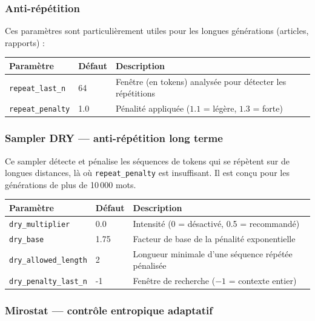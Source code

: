 \documentclass[12pt, a4paper, twoside]{article}
\begin{document}
\subsubsection{Anti-répétition}

Ces paramètres sont particulièrement utiles pour les longues générations (articles, rapports) :

\begin{center}
\begin{tabular}{L{3.5cm} C{1.5cm} L{8cm}}
  \toprule
  \textbf{Paramètre} & \textbf{Défaut} & \textbf{Description} \\
  \midrule
  \texttt{repeat\_last\_n}  & 64  & Fenêtre (en tokens) analysée pour détecter les répétitions \\
  \texttt{repeat\_penalty}  & 1.0 & Pénalité appliquée ($1.1$ = légère, $1.3$ = forte) \\
  \bottomrule
\end{tabular}
\end{center}

\subsubsection{Sampler DRY — anti-répétition long terme}

Ce sampler détecte et pénalise les séquences de tokens qui se répètent sur de longues distances,
là où \texttt{repeat\_penalty} est insuffisant. Il est conçu pour les générations de plus
de 10\,000 mots.

\begin{center}
\begin{tabular}{L{4cm} C{1.5cm} L{7.5cm}}
  \toprule
  \textbf{Paramètre} & \textbf{Défaut} & \textbf{Description} \\
  \midrule
  \texttt{dry\_multiplier}      & 0.0  & Intensité (0 = désactivé, 0.5 = recommandé) \\
  \texttt{dry\_base}            & 1.75 & Facteur de base de la pénalité exponentielle \\
  \texttt{dry\_allowed\_length} & 2    & Longueur minimale d'une séquence répétée pénalisée \\
  \texttt{dry\_penalty\_last\_n}& -1   & Fenêtre de recherche ($-1$ = contexte entier) \\
  \bottomrule
\end{tabular}
\end{center}

\subsubsection{Mirostat — contrôle entropique adaptatif}
\end{document}
